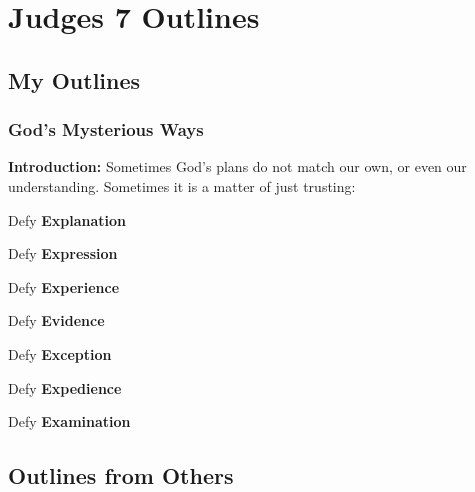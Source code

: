 \section{Judges 7 Outlines}

\subsection{My Outlines}

\subsubsection{God's Mysterious Ways}
\textbf{Introduction:} Sometimes God's plans do not match our own, or even our understanding. Sometimes it is a matter of just trusting:
\begin{compactenum}[I.][8]
    \item Defy \textbf{Explanation} %
    \item Defy \textbf{Expression} %
    \item Defy \textbf{Experience} %
    \item Defy \textbf{Evidence} %
    \item Defy \textbf{Exception} %
    \item Defy \textbf{Expedience} %
    \item Defy \textbf{Examination} %
\end{compactenum}

\subsection{Outlines from Others}